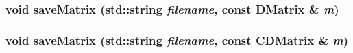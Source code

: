 \subsubsection{\setlength{\rightskip}{0pt plus 5cm}void save\-Matrix (std::string {\em filename}, const \bf{DMatrix} \& {\em m})}\label{binaryIO_8h_3ed19c8659354d707ac1a68646f73919}


\subsubsection{\setlength{\rightskip}{0pt plus 5cm}void save\-Matrix (std::string {\em filename}, const \bf{CDMatrix} \& {\em m})}\label{binaryIO_8h_2b32eb5122be168d1dee57ccf90ffac3}


